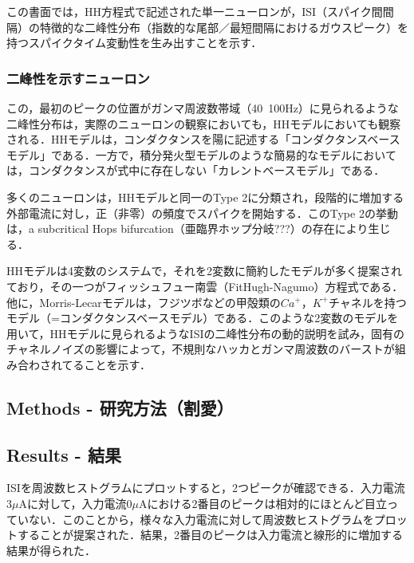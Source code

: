 \documentclass[dvipdfmx, A4j, twocolumn, 10.5pt]{jsarticle}
\begin{document}
\vspace{\baselineskip}
この書面では，HH方程式で記述された単一ニューロンが，ISI（スパイク間間隔）の特徴的な二峰性分布（指数的な尾部／最短間隔におけるガウスピーク）を持つスパイクタイム変動性を生み出すことを示す．

\subsubsection{二峰性を示すニューロン}
この，最初のピークの位置がガンマ周波数帯域（40~100Hz）に見られるような二峰性分布は，実際のニューロンの観察においても，HHモデルにおいても観察される．HHモデルは，コンダクタンスを陽に記述する「コンダクタンスベースモデル」である．一方で，積分発火型モデルのような簡易的なモデルにおいては，コンダクタンスが式中に存在しない「カレントベースモデル」である．

\vspace{\baselineskip}
多くのニューロンは，HHモデルと同一のType \romannumeral 2に分類され，段階的に増加する外部電流に対し，正（非零）の頻度でスパイクを開始する．このType \romannumeral 2の挙動は，a subcritical Hops bifurcation（亜臨界ホップ分岐???）の存在により生じる．

\vspace{\baselineskip}
HHモデルは4変数のシステムで，それを2変数に簡約したモデルが多く提案されており，その一つがフィッシュフュー南雲（FitHugh-Nagumo）方程式である．他に，Morris-Lecarモデルは，フジツボなどの甲殻類の$Ca^{+}$，$K^{+}$チャネルを持つモデル（=コンダクタンスベースモデル）である．このような2変数のモデルを用いて，HHモデルに見られるようなISIの二峰性分布の動的説明を試み，固有のチャネルノイズの影響によって，不規則なハッカとガンマ周波数のバーストが組み合わされてることを示す．
\vspace{\baselineskip}

\subsection{Methods - 研究方法（割愛）}
\vspace{\baselineskip}

\subsection{Results - 結果}
ISIを周波数ヒストグラムにプロットすると，2つピークが確認できる．入力電流$3\mu \mathrm{A}$に対して，入力電流$0\mu \mathrm{A}$における2番目のピークは相対的にほとんど目立っていない．このことから，様々な入力電流に対して周波数ヒストグラムをプロットすることが提案された．結果，2番目のピークは入力電流と線形的に増加する結果が得られた．
\end{document}
